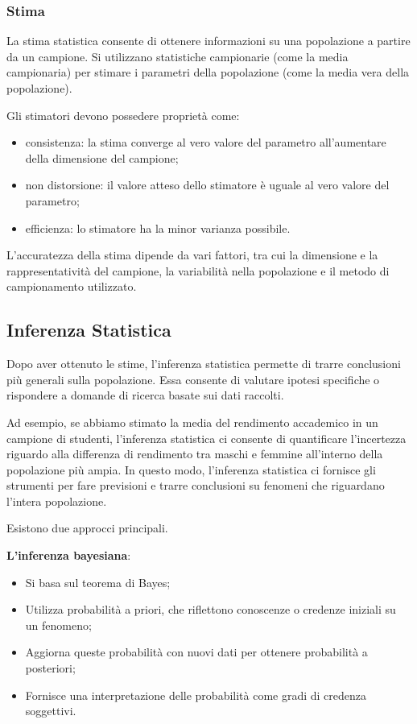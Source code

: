 \documentclass[
  letterpaper,
  DIV=11,
  numbers=noendperiod]{scrreprt}
\providecommand{\tightlist}{%
  \setlength{\itemsep}{0pt}\setlength{\parskip}{0pt}}\usepackage{longtable,booktabs,array}
\theoremstyle{definition}
\theoremstyle{remark}
\begin{document}
\subsubsection{Stima}\label{stima}

La stima statistica consente di ottenere informazioni su una popolazione
a partire da un campione. Si utilizzano statistiche campionarie (come la
media campionaria) per stimare i parametri della popolazione (come la
media vera della popolazione).

Gli stimatori devono possedere proprietà come:

\begin{itemize}
\tightlist
\item
  consistenza: la stima converge al vero valore del parametro
  all'aumentare della dimensione del campione;
\item
  non distorsione: il valore atteso dello stimatore è uguale al vero
  valore del parametro;
\item
  efficienza: lo stimatore ha la minor varianza possibile.
\end{itemize}

L'accuratezza della stima dipende da vari fattori, tra cui la dimensione
e la rappresentatività del campione, la variabilità nella popolazione e
il metodo di campionamento utilizzato.

\subsection{Inferenza Statistica}\label{inferenza-statistica}

Dopo aver ottenuto le stime, l'inferenza statistica permette di trarre
conclusioni più generali sulla popolazione. Essa consente di valutare
ipotesi specifiche o rispondere a domande di ricerca basate sui dati
raccolti.

Ad esempio, se abbiamo stimato la media del rendimento accademico in un
campione di studenti, l'inferenza statistica ci consente di quantificare
l'incertezza riguardo alla differenza di rendimento tra maschi e femmine
all'interno della popolazione più ampia. In questo modo, l'inferenza
statistica ci fornisce gli strumenti per fare previsioni e trarre
conclusioni su fenomeni che riguardano l'intera popolazione.

Esistono due approcci principali.

\textbf{L'inferenza bayesiana}:

\begin{itemize}
\tightlist
\item
  Si basa sul teorema di Bayes;
\item
  Utilizza probabilità a priori, che riflettono conoscenze o credenze
  iniziali su un fenomeno;
\item
  Aggiorna queste probabilità con nuovi dati per ottenere probabilità a
  posteriori;
\item
  Fornisce una interpretazione delle probabilità come gradi di credenza
  soggettivi.
\end{itemize}
\end{document}
